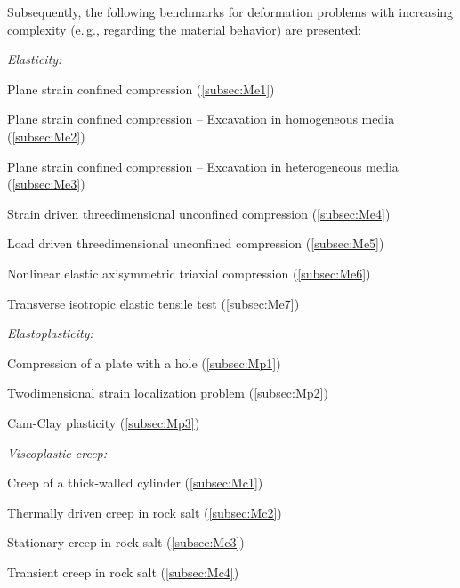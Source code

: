 Subsequently, the following benchmarks for deformation problems with increasing complexity (e.\,g., regarding the material behavior) are presented:

\medskip
{\sl Elasticity:}

\smallskip
\begin{compactitem}
	\item Plane strain confined compression (\ref{subsec:Me1})
	\item Plane strain confined compression -- Excavation in homogeneous media (\ref{subsec:Me2})
	\item Plane strain confined compression -- Excavation in heterogeneous media (\ref{subsec:Me3})
	\item Strain driven threedimensional unconfined compression (\ref{subsec:Me4})
	\item Load driven threedimensional unconfined compression (\ref{subsec:Me5})
	\item Nonlinear elastic axisymmetric triaxial compression (\ref{subsec:Me6})
	\item Transverse isotropic elastic tensile test (\ref{subsec:Me7})
\end{compactitem}

\medskip
{\sl Elastoplasticity:}

\smallskip
\begin{compactitem}
	\item Compression of a plate with a hole (\ref{subsec:Mp1})
	\item Twodimensional strain localization problem (\ref{subsec:Mp2})
	\item Cam-Clay plasticity (\ref{subsec:Mp3})
\end{compactitem}

\medskip
{\sl Viscoplastic creep:}

\smallskip
\begin{compactitem}
	\item Creep of a thick-walled cylinder (\ref{subsec:Mc1})
	\item Thermally driven creep in rock salt (\ref{subsec:Mc2})
	\item Stationary creep in rock salt (\ref{subsec:Mc3})
	\item Transient creep in rock salt (\ref{subsec:Mc4})
\end{compactitem}
